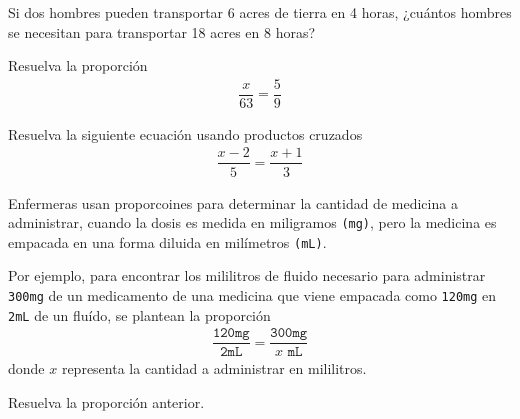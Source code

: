 	\begin{problema}
		Si dos hombres pueden transportar 6 acres de tierra en 4 horas, ¿cuántos hombres se necesitan para transportar 18 acres en 8 horas?
	\end{problema}
	

{}
	\begin{problema}
		Resuelva la proporción
		\begin{align*}
			\dfrac{x}{63}=\dfrac{5}{9}
		\end{align*}
		
	\end{problema}
	

{}
	\begin{problema}
		Resuelva la siguiente ecuación usando productos cruzados
		\begin{align*}
			\dfrac{x-2}{5}=\dfrac{x+1}{3}
		\end{align*}
		
	\end{problema}
	

{}
	\begin{problema}
		Enfermeras usan proporcoines para determinar la cantidad de medicina a administrar, cuando la dosis es medida en miligramos \texttt{(mg)}, pero la medicina es empacada en una forma diluida en milímetros \texttt{(mL)}.	
		
		
		
		Por ejemplo, para encontrar los mililitros de fluido necesario para administrar \texttt{300mg} de un medicamento de una medicina que viene empacada como \texttt{120mg} en \texttt{2mL} de un fluído, se plantean la proporción
		\begin{align*}
			\dfrac{\texttt{120mg}}{\texttt{2mL}}=\dfrac{\texttt{300mg}}{x \texttt{ mL}}
		\end{align*}
		donde $x$ representa la cantidad a administrar en mililitros. 
		
		Resuelva la proporción anterior.
	\end{problema}


